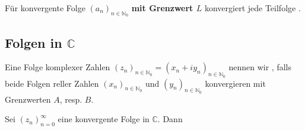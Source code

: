 Für konvergente Folge $(a_n)_{n \in \mathbb{N}_0}$ \textbf{mit Grenzwert $L$} konvergiert jede Teilfolge .

\subsection{Folgen in $\mathbb{C}$}

Eine Folge komplexer Zahlen $(z_n)_{n \in \mathbb{N}_0}=(x_n+iy_n)_{n \in \mathbb{N}_0}$ nennen wir , falls beide Folgen reller Zahlen $(x_n)_{n \in \mathbb{N}_0}$ und $(y_n)_{n \in \mathbb{N}_0}$ konvergieren mit Grenzwerten $A$, resp. $B$.

Sei $(z_n)_{n=0}^\infty$ eine konvergente Folge in $\mathbb{C}$. Dann 